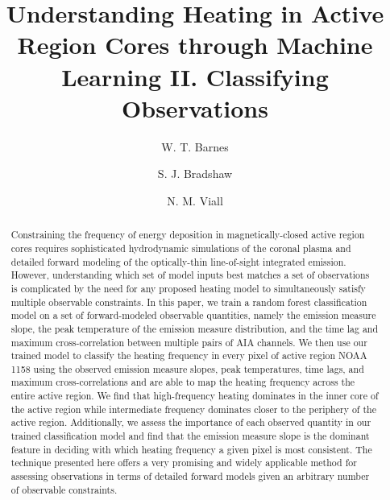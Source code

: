 \documentclass[modern,linenumbers,longauthor]{aastex63}
\newcommand{\AR}{active region}
\begin{document}
\title{Understanding Heating in Active Region Cores through Machine Learning II. Classifying Observations}
\author[0000-0001-9642-6089]{W. T. Barnes}
\author[0000-0002-3300-6041]{S. J. Bradshaw}
\author[0000-0003-1692-1704]{N. M. Viall}

\begin{abstract}
Constraining the frequency of energy deposition in magnetically-closed \AR{} cores requires sophisticated hydrodynamic simulations of the coronal plasma and detailed forward modeling of the optically-thin line-of-sight integrated emission.
However, understanding which set of model inputs best matches a set of observations is complicated by the need for any proposed heating model to simultaneously satisfy multiple observable constraints.
In this paper, we train a random forest classification model on a set of forward-modeled observable quantities, namely the emission measure slope, the peak temperature of the emission measure distribution, and the time lag and maximum cross-correlation between multiple pairs of AIA channels.
We then use our trained model to classify the heating frequency in every pixel of \AR{} NOAA 1158 using the observed emission measure slopes, peak temperatures, time lags, and maximum cross-correlations and are able to map the heating frequency across the entire active region.
We find that high-frequency heating dominates in the inner core of the \AR{} while intermediate frequency dominates closer to the periphery of the \AR{}.
Additionally, we assess the importance of each observed quantity in our trained classification model and find that the emission measure slope is the dominant feature in deciding with which heating frequency a given pixel is most consistent.
The technique presented here offers a very promising and widely applicable method for assessing observations in terms of detailed forward models given an arbitrary number of observable constraints.
\end{abstract}
\end{document}
